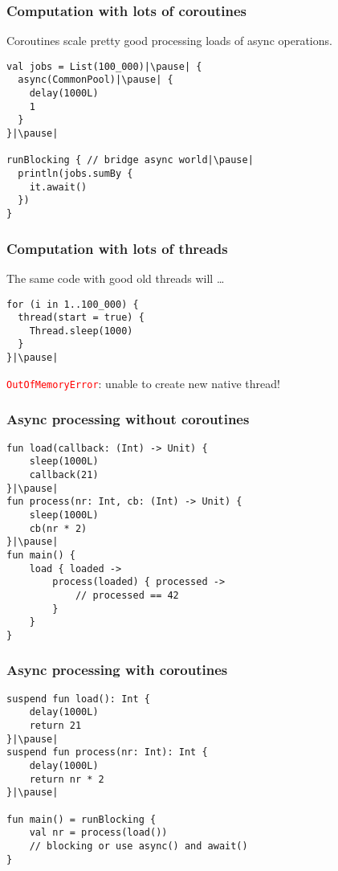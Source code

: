 \begin{frame}[fragile] \frametitle{Computation with lots of coroutines}
Coroutines scale pretty good processing loads of async operations.\pause
\begin{lstlisting}
val jobs = List(100_000)|\pause| {
  async(CommonPool)|\pause| {
    delay(1000L)
    1
  }
}|\pause|

runBlocking { // bridge async world|\pause|
  println(jobs.sumBy {
    it.await()
  })
}
\end{lstlisting}
\end{frame}

\begin{frame}[fragile] \frametitle{Computation with lots of threads}
The same code with good old threads will \ldots
\begin{lstlisting}
for (i in 1..100_000) {
  thread(start = true) {
    Thread.sleep(1000)
  }
}|\pause|
\end{lstlisting}
\texttt{\textcolor{red}{OutOfMemoryError}}: unable to create new native thread!
\end{frame}

\begin{frame}[fragile] \frametitle{Async processing without coroutines}
\begin{lstlisting}
fun load(callback: (Int) -> Unit) {
    sleep(1000L)
    callback(21)
}|\pause|
fun process(nr: Int, cb: (Int) -> Unit) {
    sleep(1000L)
    cb(nr * 2)
}|\pause|
fun main() {
    load { loaded ->
        process(loaded) { processed ->
            // processed == 42
        }
    }
}
\end{lstlisting}
\end{frame}




\begin{frame}[fragile] \frametitle{Async processing with coroutines}
\begin{lstlisting}
suspend fun load(): Int {
    delay(1000L)
    return 21
}|\pause|
suspend fun process(nr: Int): Int {
    delay(1000L)
    return nr * 2
}|\pause|

fun main() = runBlocking {
    val nr = process(load())
    // blocking or use async() and await()
}
\end{lstlisting}
\end{frame}

